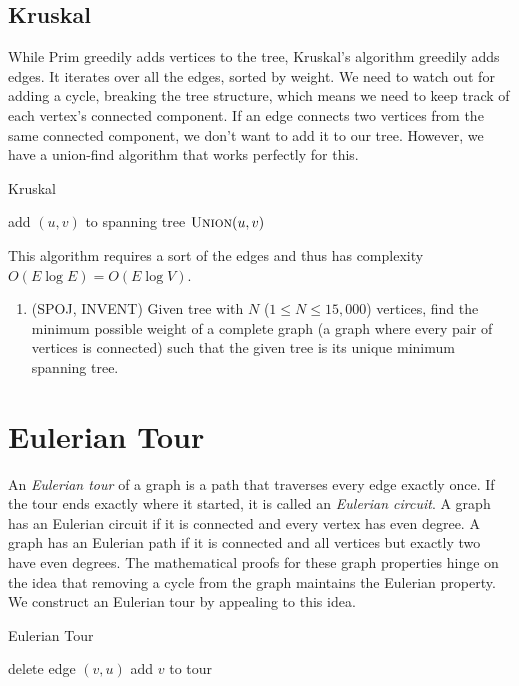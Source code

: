 \documentclass[11pt]{book}
\begin{document}
\subsection{Kruskal}

While Prim greedily adds vertices to the tree, Kruskal's algorithm greedily adds edges. It iterates over all the edges, sorted by weight. We need to watch out for adding a cycle, breaking the tree structure, which means we need to keep track of each vertex's connected component. If an edge connects two vertices from the same connected component, we don't want to add it to our tree. However, we have a union-find algorithm that works perfectly for this.

\begin{algorithm}[H]
\caption{Kruskal}
\begin{algorithmic}
		\State add $(u,v)$ to spanning tree
		\State $\Call{Union}{u,v}$
	\EndIf
\EndFor
\end{algorithmic}
\end{algorithm}

This algorithm requires a sort of the edges and thus has complexity $O(E \log{E}) = O(E \log{V})$.

\begin{enumerate}
\item
(SPOJ, INVENT)
Given tree with $N$ ($1 \le N \le 15,000$) vertices, find the minimum possible weight of a complete
graph (a graph where every pair of vertices is connected) such that the given tree is its unique minimum spanning
tree.
\end{enumerate}

\section{Eulerian Tour}

An \textit{Eulerian tour} of a graph is a path that traverses every edge exactly once. If the tour ends exactly where it started, it is called an \textit{Eulerian circuit}. A graph has an Eulerian circuit if it is connected and every vertex has even degree. A graph has an Eulerian path if it is connected and all vertices but exactly two have even degrees. The mathematical proofs for these graph properties hinge on the idea that removing a cycle from the graph maintains the Eulerian property. We construct an Eulerian tour by appealing to this idea.

\begin{algorithm}
\caption{Eulerian Tour}
\begin{algorithmic}
	\State delete edge $(v,u)$
	\State {}
\EndWhile
\State add $v$ to tour
\EndFunction
\end{algorithmic}
\end{algorithm}
\end{document}
